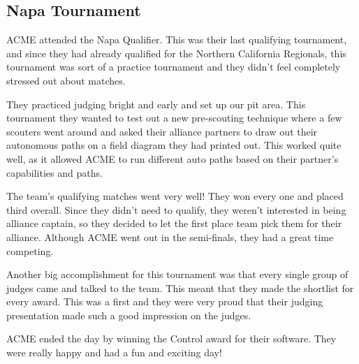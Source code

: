 \documentclass{article}
\begin{document}
\subsection{Napa Tournament}
ACME attended the Napa Qualifier. This was their last qualifying tournament, and since they had already qualified for the Northern California Regionals, this tournament was sort of a practice tournament and they didn't feel completely stressed out about matches. 

They practiced judging bright and early and set up our pit area. This tournament they wanted to test out a new pre-scouting technique where a few scouters went around and asked their alliance partners to draw out their autonomous paths on a field diagram they had printed out. This worked quite well, as it allowed ACME to run different auto paths based on their partner's capabilities and paths. 

The team's qualifying matches went very well! They won every one and placed third overall. Since they didn't need to qualify, they weren't interested in being alliance captain, so they decided to let the first place team pick them for their alliance. Although ACME went out in the semi-finals, they had a great time competing. 

Another big accomplishment for this tournament was that every single group of judges came and talked to the team. This meant that they made the shortlist for every award. This was a first and they were very proud that their judging presentation made such a good impression on the judges. 

ACME ended the day by winning the Control award for their software. They were really happy and had a fun and exciting day!
\end{document}
